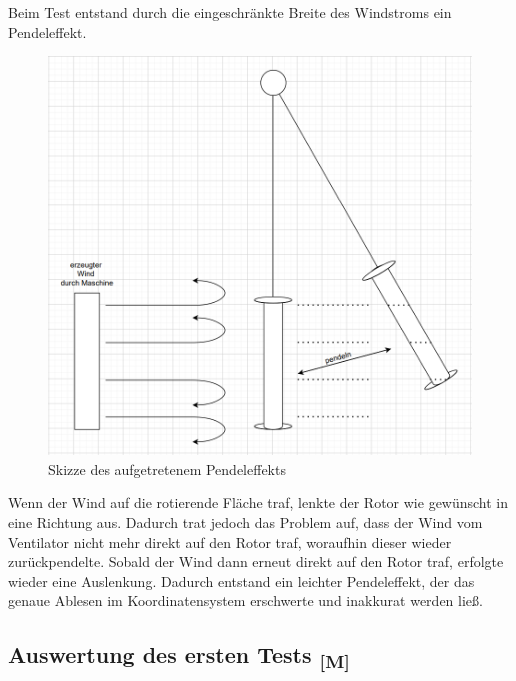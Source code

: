 \documentclass[a4paper,12pt]{article}
\begin{document}
Beim Test entstand durch die eingeschränkte Breite des Windstroms ein Pendeleffekt. 
\begin{figure}[H]
    \centering
    \includegraphics[width=0.9\linewidth]{images/Rotorpendeln.png}
    \caption{Skizze des aufgetretenem Pendeleffekts}
    \label{fig:SKizze Pendeleffekt}
\end{figure}
Wenn der Wind auf die rotierende Fläche traf, lenkte der Rotor wie gewünscht in eine Richtung aus. Dadurch trat jedoch das Problem auf, dass der Wind vom Ventilator nicht mehr direkt auf den Rotor traf, woraufhin dieser wieder zurückpendelte. Sobald der Wind dann erneut direkt auf den Rotor traf, erfolgte wieder eine Auslenkung. Dadurch entstand ein leichter Pendeleffekt, der das genaue Ablesen im Koordinatensystem erschwerte und inakkurat werden ließ.

\newpage

\subsection{\texorpdfstring{Auswertung des ersten Tests \textsubscript{[M]}}{Auswertung der ersten Tests [M]}}
\end{document}
